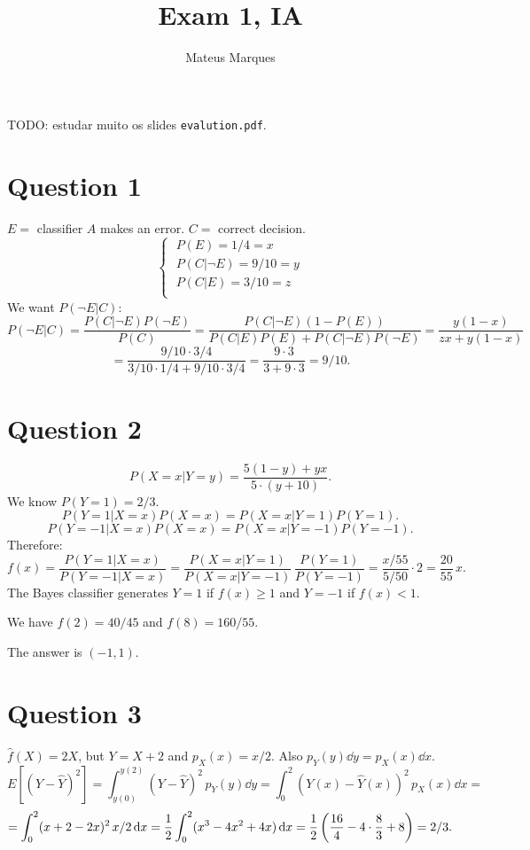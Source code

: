 \documentclass[a4paper,fleqn,12pt]{article}
\title{\Huge{\textbf{Exam 1, IA}}}
\author{Mateus Marques}
\begin{document}
\maketitle

TODO: estudar muito os slides \texttt{evalution.pdf}.

\section{Question 1}
$E =$ classifier $A$ makes an error. $C =$ correct decision.
$$
\begin{cases}
\; P(E) = 1/4 = x \\
\; P(C | \neg E) = 9/10 = y \\
\; P(C | E) = 3/10 = z \\
\end{cases}
$$
We want $P(\neg E| C)$:
$$
P(\neg E | C) = \frac{P(C | \neg E) P(\neg E)}{P(C)} =
\frac{P(C|\neg E) (1-P(E))}{P(C|E) P(E) + P(C|\neg E) P(\neg E)} =
\frac{y (1-x)}{z x + y (1-x)}
$$
$$
= \frac{9/10 \cdot 3/4}{3/10 \cdot 1/4 + 9/10 \cdot 3/4} =
\frac{9 \cdot 3}{3 + 9 \cdot 3} = 9/10.
$$

\section{Question 2}

$$
P(X = x | Y = y) = \frac{5(1-y) + yx}{5 \cdot (y + 10)}.
$$
We know $P(Y=1) = 2/3$.
$$
P(Y = 1 | X = x) P(X = x) = P(X = x | Y=1) P(Y = 1).
$$
$$
P(Y = -1 | X = x) P(X = x) = P(X = x | Y=-1) P(Y = -1).
$$
Therefore:
$$
f(x) = \frac{P(Y=1|X=x)}{P(Y=-1|X=x)} = \frac{P(X=x|Y=1)}{P(X=x|Y=-1)} \, \frac{P(Y=1)}{P(Y=-1)} =
\frac{x/55}{5/50} \cdot 2 = \frac{20}{55} \, x.
$$
The Bayes classifier generates $Y = 1$ if $f(x) \geq 1$ and $Y = -1$ if $f(x) < 1$.

We have $f(2) = 40/45$ and $f(8) = 160/55$.

\n

The answer is $(-1, 1)$.

\section{Question 3}

$\hat{f}(X) = 2X$, but $Y = X+2$ and $p_X(x) = x/2$. Also $p_Y(y) \dd{y} = p_X(x) \dd{x}$.
$$
E[(Y - \hat{Y})^2] = \int_{y(0)}^{y(2)} (Y-\hat{Y})^2 \, p_Y(y) \dd{y} =
\int_{0}^{2} (Y(x)-\hat{Y}(x))^2 \, p_X(x) \dd{x} =
$$
$$
= \int_{0}^{2} (x + 2 - 2x)^2 \, x / 2 \dd{x} = \frac{1}{2} \int_0^2 (x^3-4x^2+4x) \dd{x} =
\frac{1}{2} \, \qty(\frac{16}{4} - 4 \cdot \frac{8}{3} + 8) = 2/3.
$$
\end{document}
